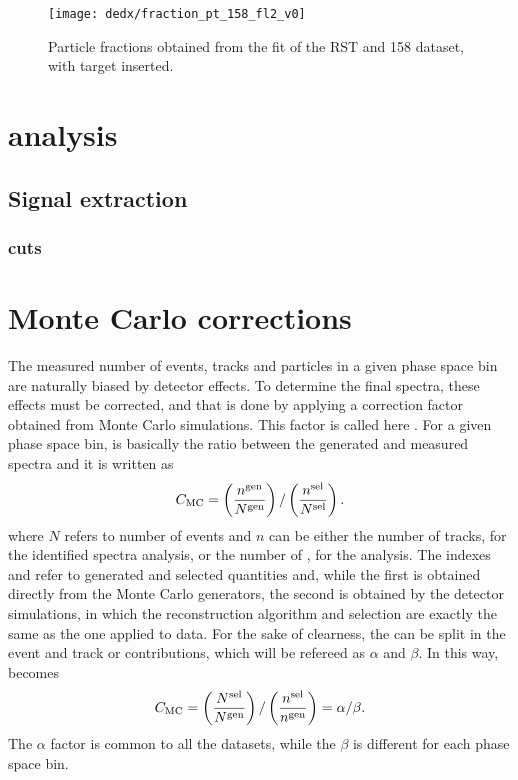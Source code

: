 \begin{figure}
  \centering
  \texttt{[image: dedx/fraction\_pt\_158\_fl2\_v0]}
  \caption{Particle fractions obtained from the \dedx fit of the RST and 158 \GeVc dataset, with target inserted.}
  \label{fig:hadron:dedx:fit:final158r}
\end{figure}


\section{\vzero analysis}
\label{sec:hadron:vzero}


\subsection{Signal extraction}
\label{sec:hadron:vzero:signal}


\subsubsection{\vzero cuts}
\label{sec:hadron:vzero:signal:cuts}


\section{Monte Carlo corrections}
\label{sec:hadron:correction}


The measured number of events, tracks and \vzeros
particles in a given phase space bin are naturally biased by
detector effects. To determine the final spectra,
these effects must be corrected, and that
is done by applying a correction factor obtained
from Monte Carlo simulations. This factor is called here \cmc.
For a given phase space bin, \cmc is basically the ratio
between the generated and measured spectra and it
is written as
\begin{equation}
  \mbox{$C_\text{MC}$} = \left( \frac{n^\text{gen}}{N^\text{gen}} \right) / \left( \frac{n^\text{sel}}{N^\text{sel}} \right).
  \label{eq:hadron:correction:cmc}
\end{equation}
where $N$ refers to number of events and $n$ can be either the number of
tracks, for the identified spectra analysis, or the number
of \vzeros, for the \vzero analysis.
The indexes \gen and \sel refer to generated and selected quantities and,
while the first is obtained directly from the Monte Carlo generators,
the second is obtained by the detector simulations, in which the
reconstruction algorithm and selection are exactly the same
as the one applied to data.
For the sake of clearness, the \cmc can be split in the
event and track or \vzero contributions, which will be refereed as
$\alpha$ and $\beta$. In this way, \cmc becomes
\begin{equation}
  \mbox{$C_\text{MC}$} = \left( \frac{N^\text{sel}}{N^\text{gen}} \right) / \left( \frac{n^\text{sel}}{n^\text{gen}} \right) = \alpha / \beta.
  \label{eq:hadron:correction:cmc:2}
\end{equation}
The $\alpha$ factor is common to all the datasets,
while the $\beta$ is different for each phase space bin. 

